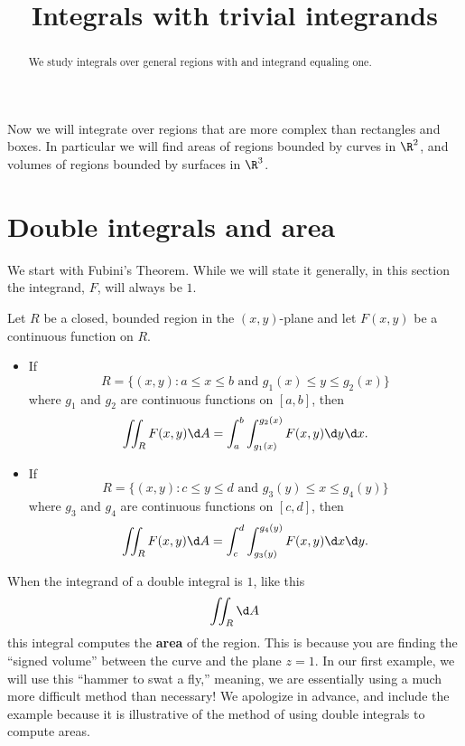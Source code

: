 \documentclass{ximera}
\title[Dig-In:]{Integrals with trivial integrands}
\begin{document}
\begin{abstract}
  We study integrals over general regions with and integrand equaling one.
\end{abstract}
\maketitle


Now we will integrate over regions that are more complex than
rectangles and boxes. In particular we will find areas of regions
bounded by curves in $\R^2$, and volumes of regions bounded by
surfaces in $\R^3$.

\section{Double integrals and area}

We start with Fubini's Theorem. While we will state it generally, in
this section the integrand, $F$, will always be $1$.

\begin{theorem}
  Let $R$ be a closed, bounded region in the $(x,y)$-plane and let
  $F(x,y)$ be a continuous function on $R$.
  \begin{itemize}
  \item If
    \[
    R=\{(x,y):\text{$a\leq x\leq b$ and $g_1(x)\leq y\leq g_2(x)$}\}
    \]
    where $g_1$ and $g_2$ are continuous functions on $[a,b]$, then
    \[
    \iint_R F(x,y) \d A = \int_a^b\int_{g_1(x)}^{g_2(x)} F(x,y)\d y\d x.
    \]
  \item If
    \[
    R=\{(x,y):\text{$c\leq y\leq d$ and $g_3(y)\leq x\leq g_4(y)$}\}
    \]
    where $g_3$ and $g_4$ are continuous functions on $[c,d]$, then
    \[
    \iint_R F(x,y)\d A = \int_c^d\int_{g_3(y)}^{g_4(y)} F(x,y)\d x\d y.
    \]
\end{itemize}
\end{theorem}

When the integrand of a double integral is $1$, like this
\[
\iint_R\d A
\]
this integral computes the \textbf{area} of the region. This is
because you are finding the ``signed volume'' between the curve and
the plane $z=1$. In our first example, we will use this ``hammer to
swat a fly,'' meaning, we are essentially using a much more difficult
method than necessary! We apologize in advance, and include the
example because it is illustrative of the method of using double
integrals to compute areas.
\end{document}
